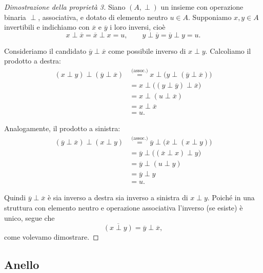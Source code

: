 {\begin{proof}[Dimostrazione della proprietà 3]
    Siano \((A,\perp)\) un insieme con operazione binaria \(\perp\), associativa, e dotato di elemento neutro \(u\in A\).
    Supponiamo \(x,y\in A\) invertibili e indichiamo con \(\overline{x}\) e \(\overline{y}\) i loro inversi, cioè
    \[
    x\perp\overline{x}=\overline{x}\perp x = u,\qquad
    y\perp\overline{y}=\overline{y}\perp y = u.
    \]
    
    Consideriamo il candidato \( \overline{y}\perp\overline{x} \) come possibile inverso di \(x\perp y\).
    Calcoliamo il prodotto a destra:
    \[
    \begin{aligned}
    (x\perp y)\perp(\overline{y}\perp\overline{x})
    &\stackrel{\text{(assoc.)}}{=}
    x\perp\bigl(y\perp(\overline{y}\perp\overline{x})\bigr) \\
    &= x\perp\bigl((y\perp\overline{y})\perp\overline{x}\bigr) \\
    &= x\perp(u\perp\overline{x}) \\
    &= x\perp\overline{x} \\
    &= u.
    \end{aligned}
    \]
    
    Analogamente, il prodotto a sinistra:
    \[
    \begin{aligned}
    (\overline{y}\perp\overline{x})\perp(x\perp y)
    &\stackrel{\text{(assoc.)}}{=}
    \overline{y}\perp\bigl(\overline{x}\perp(x\perp y)\bigr) \\
    &= \overline{y}\perp\bigl((\overline{x}\perp x)\perp y\bigr) \\
    &= \overline{y}\perp(u\perp y) \\
    &= \overline{y}\perp y \\
    &= u.
    \end{aligned}
    \]
    
    Quindi \(\overline{y}\perp\overline{x}\) è sia inverso a destra sia inverso a sinistra di \(x\perp y\). 
    Poiché in una struttura con elemento neutro e operazione associativa l'inverso (se esiste) è unico, segue che
    \[
    \overline{(x\perp y)} = \overline{y}\perp\overline{x},
    \]
    come volevamo dimostrare.
\end{proof}
    
    
}




\subsection{Anello}

